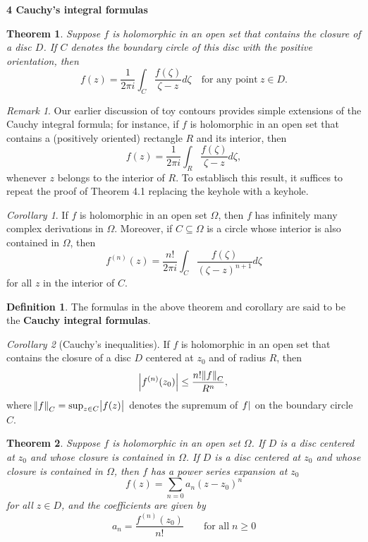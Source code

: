 \documentclass{article}
\newtheorem{theorem}{Theorem}
\theoremstyle{definition}
\newtheorem{definition}{Definition}[section]
\theoremstyle{remark}
\newtheorem*{remark}{Remark}
\newtheorem{corollary}{Corollary}[theorem]
\begin{document}
    \newpage

    \textbf{4 Cauchy's integral formulas}

    \begin{theorem}
        Suppose $f$ is holomorphic in an open set that contains the closure of a disc $D$. If $C$ denotes the boundary circle of this
        disc with the positive orientation, then
        \[ f(z) = \frac{1}{2\pi i}\int_C \frac{f(\zeta)}{\zeta-z}d\zeta \quad\text{for any point}\:z\in D.\]
    \end{theorem}

    \begin{remark}
        Our earlier discussion of toy contours provides simple extensions of the Cauchy integral formula; for instance, if $f$ is
        holomorphic in an open set that contains a (positively oriented) rectangle $R$ and its interior, then
        \[ f(z) = \frac{1}{2\pi i}\int_R \frac{f(\zeta)}{\zeta-z}d\zeta, \]
        whenever $z$ belongs to the interior of $R$. To establisch this result, it suffices to repeat the proof of Theorem 4.1
        replacing the  keyhole with a  keyhole.
    \end{remark}

    \begin{corollary}
        If $f$ is holomorphic in an open set $\Omega$, then $f$ has infinitely many complex derivations in $\Omega$. Moreover,
        if $C\subseteq\Omega$ is a circle whose interior is also contained in $\Omega$, then
        \[ f^{(n)}(z) = \frac{n!}{2\pi i}\int_C \frac{f(\zeta)}{(\zeta-z)^{n+1}}d\zeta \]
        for all $z$ in the interior of $C$.
    \end{corollary}

    \begin{definition}
        The formulas in the above theorem and corollary are said to be the \textbf{Cauchy integral formulas}.
    \end{definition}

    \begin{corollary}[Cauchy's inequalities]
        If $f$ is holomorphic in an open set that contains the closure of a disc $D$ centered at $z_0$ and of radius $R$, then
        \[ \abs{f^{(n)}(z_0)}\leq \frac{n!\norm{f}_C}{R^n}, \]
        where $\norm{f}_C = \sup_{z\in C}\abs{f(z)}$ denotes the supremum of $\abs{f}$ on the boundary circle $C$.
    \end{corollary}

    \begin{theorem}
        Suppose $f$ is holomorphic in an open set $\Omega$. If $D$ is a disc centered at $z_0$ and whose closure is contained in
        $\Omega$. If $D$ is a disc centered at $z_0$ and whose closure is contained in $\Omega$, then $f$ has a power series
        expansion at $z_0$
        \[ f(z) = \sum_{n=0} a_n(z-z_0)^n \]
        for all $z\in D$, and the coefficients are given by
        \[ a_n = \frac{f^{(n)}(z_0)}{n!}\qquad\text{for all}\;n\geq 0 \]
    \end{theorem}
\end{document}
